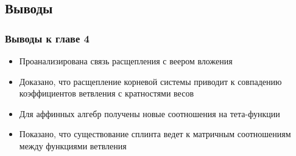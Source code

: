 \documentclass[pdftex]{beamer}
\newcommand{\gf}{\mathfrak{g}}
\newcommand{\gfh}{\hat{\mathfrak{g}}}
\newcommand{\af}{\mathfrak{a}}
\newcommand{\sfr}{\mathfrak{s}}
\theoremstyle{definition} \newtheorem{Def}{Определение}
\begin{document}
\subsection{Выводы}
\begin{frame}
  \frametitle{Выводы к главе 4}
  \begin{itemize}
  \item Проанализирована связь расщепления с веером вложения
  \item Доказано, что расщепление корневой системы приводит к совпадению коэффициентов ветвления с кратностями весов
  \item Для аффинных алгебр получены новые соотношения на тета-функции
  \item Показано, что существование сплинта ведет к матричным соотношениям между функциями ветвления 
  \end{itemize}
\end{frame}
\end{document}
